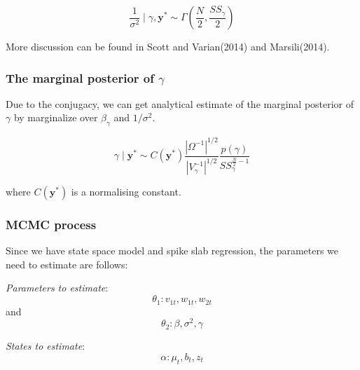 $$\frac {1}{\sigma^{2}} \mid \gamma, \mathbf{y}^* \sim  \Gamma(\frac{N}{2}, \frac{SS_{\gamma}}{2})$$  











More discussion can be found in Scott and Varian(2014)  and Marsili(2014). 




\subsubsection{The marginal posterior of $\gamma$}




Due to the conjugacy, we can get analytical estimate of the marginal posterior of $\gamma$ by marginalize over  $\beta_{\gamma}$ and ${1}/{\sigma^{2}}$. 







$$\gamma \mid \mathbf{y}^* \sim C(\mathbf{y}^*) \frac{|\Omega^{-1}|^{1/2}}{|V_{\gamma}^{-1}|^{1/2}} \frac{p(\gamma)}{SS_{\gamma}^{\frac{N}{2} -1}}$$







where $C(\mathbf{y}^*)$ is a normalising constant. 



\subsubsection{MCMC process}






Since we have state space model and spike slab regression, the parameters we need to  estimate are follows: 







\textit{Parameters to estimate}: $$\theta_1: v_{1t},w_{1t}, w_{2t}$$ and $$\theta_2: \beta, \sigma^2,  \gamma$$







\textit{States to estimate}: $$\alpha:  \mu_t, b_t,  z_t$$







